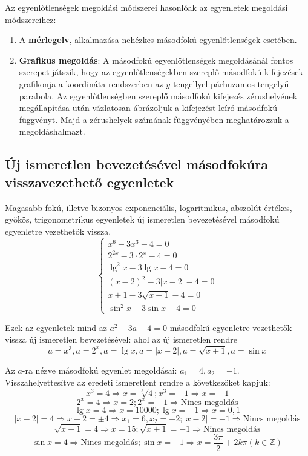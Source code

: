 \documentclass[12pt,a4paper]{article}
\begin{document}
Az egyenlőtlenségek megoldási módszerei hasonlóak az egyenletek megoldási módszereihez:
\begin{enumerate}
\item A \textbf{mérlegelv}, alkalmazása nehézkes másodfokú egyenlőtlenségek esetében.
\item \textbf{Grafikus megoldás}: A másodfokú egyenlőtlenségek megoldásánál fontos szerepet játszik, hogy az egyenlőtlenségekben szereplő másodfokú kifejezések grafikonja a koordináta-rendszerben az $y$ tengellyel párhuzamos tengelyű parabola. Az egyenlőtlenségben szereplő másodfokú kifejezés zérushelyének megállapítása után vázlatosan ábrázoljuk a kifejezést leíró másodfokú függvényt. Majd a zérushelyek számának függvényében meghatározzuk a megoldáshalmazt. 
\end{enumerate}
\newpage
\subsection{Új ismeretlen bevezetésével másodfokúra visszavezethető egyenletek}
Magasabb fokú, illetve bizonyos exponenciális, logaritmikus, abszolút értékes, gyökös, trigonometrikus egyenletek új ismeretlen bevezetésével másodfokú egyenletre vezethetők vissza.
\[
\begin{cases}
x^6-3x^3-4=0 \\
2^{2x}-3\cdot 2^x-4=0 \\
\lg^2x-3\lg x-4=0 \\
(x-2)^2-3|x-2|-4=0 \\
x+1-3\sqrt{x+1}-4=0 \\
\sin^2 x-3\sin x-4=0
\end{cases}
\]

Ezek az egyenletek mind az $a^2 - 3a - 4 = 0$ másodfokú egyenletre vezethetők vissza új ismeretlen bevezetésével: ahol az új ismeretlen rendre 
$$a=x^3, a=2^x, a=\lg x, a=|x-2|, a=\sqrt{x+1}, a=\sin x$$

Az $a$-ra nézve másodfokú egyenlet megoldásai: $a_1 = 4, a_2 = -1$. Visszahelyettesítve az eredeti ismeretlent rendre a következőket kapjuk:
$$x^3=4 \Rightarrow x = \sqrt[3]{4}; x^3=-1 \Rightarrow x=-1$$
$$2^x=4 \Rightarrow x = 2; 2^x=-1 \Rightarrow \text{Nincs megoldás}$$
$$\lg x = 4 \Rightarrow x = 10000; \lg x = -1 \Rightarrow x = 0,1$$
$$|x-2|=4 \Rightarrow x-2=\pm 4 \Rightarrow x_1=6, x_2=-2; |x-2|=-1 \Rightarrow \text{Nincs megoldás}$$
$$\sqrt{x+1}=4 \Rightarrow x = 15; \sqrt{x+1} = -1 \Rightarrow \text{Nincs megoldás}$$
$$\sin x = 4\Rightarrow \text{Nincs megoldás}; \sin x=-1 \Rightarrow x = \dfrac{3\pi}{2}+2k\pi (k\in \mathbb{Z})$$
\end{document}
